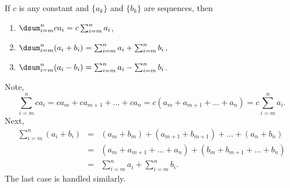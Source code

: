 \documentclass{book}
\begin{document}
\begin{Thm}\label{thm:a} If $c$ is any constant and $\{a_k\}$ and $\{b_k\}$ are sequences, then 
\begin{enumerate}
\item\label{item:a} $\dsum_{i=m}^n ca_i = c\sum_{i=m}^n a_i$,\\

\item $\dsum_{i=m}^n (a_i+b_i) = \sum_{i=m}^n a_i + \sum_{i=m}^n b_i$,\\

\item $\dsum_{i=m}^n(a_i-b_i) = \sum_{i=m}^n a_i - \sum_{i=m}^n b_i$.
\end{enumerate}
\end{Thm}

\begin{pf}
Note, 
\[\sum_{i=m}^n ca_i =  ca_m + ca_{m+1} + \ldots + ca_n = c(a_m + a_{m+1} + \ldots + a_n) = c\sum_{i=m}^n a_i.\]
 Next, 
\begin{eqnarray*}
\sum_{i=m}^n (a_i+b_i) &=& (a_m+b_m) + (a_{m+1} + b_{m+1}) + \ldots + (a_n+b_n)\\
& =& (a_m + a_{m+1} + \ldots + a_n) + (b_m + b_{m+1} + \ldots + b_n)\\
& =& \sum_{i=m}^n a_i + \sum_{i=m}^n b_i.
\end{eqnarray*} The last case is handled similarly.
\end{pf}\vs
\end{document}
